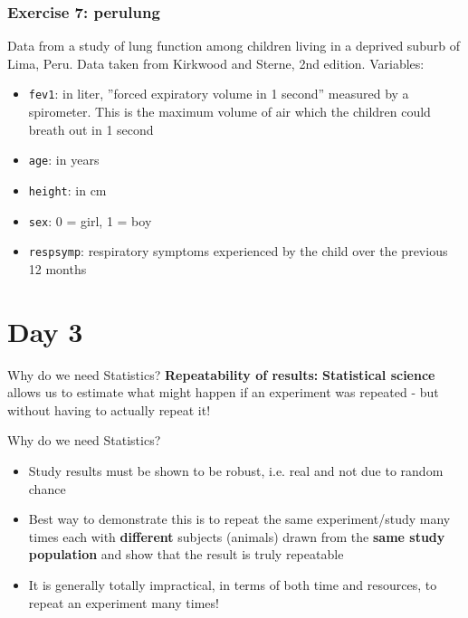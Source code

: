 \documentclass{beamer}\usepackage[]{graphicx}\usepackage[]{color}
\begin{document}
{{{\begin{frame}[fragile]
\end{frame}


\begin{frame}[fragile]
\frametitle{Exercise 7: perulung}
Data from a study of lung function among children living in a deprived suburb of
Lima, Peru. Data taken from Kirkwood and Sterne, 2nd edition. \newline
Variables:
\begin{itemize}
\item \texttt{fev1}:  in liter, ''forced expiratory volume in 1 second'' measured
by a spirometer. This is the maximum volume of air which the children could breath
out in 1 second
\item \texttt{age}: in years
\item \texttt{height}: in cm
\item \texttt{sex}: 0 = girl, 1 = boy
\item \texttt{respsymp}: respiratory symptoms experienced by the child over the
previous 12 months
\end{itemize}
\end{frame}

\section{Day 3}
\usebackgroundtemplate{}
\begin{frame}{Why do we need Statistics?}
\Large{\textbf{Repeatability of results:}} \newline
\textbf{Statistical science} allows us to
estimate what might happen if an experiment was repeated - but without having to
actually repeat it!
\end{frame}


\begin{frame}{Why do we need Statistics?}
\vspace{0.5cm}
\begin{itemize}
\setlength\itemsep{1.5em}
\item Study results must be shown to be robust, i.e. real and not due to random
chance
\item Best way to demonstrate this is to repeat the same experiment/study many
times each with {\bfseries different} subjects (animals) drawn from the {\bfseries
same study population} and show that the result is truly repeatable
\item It is generally totally impractical, in terms of both time and resources,
to repeat an experiment many times!
\end{itemize}
\vspace{0.5cm}
\end{frame}

}}}
\end{document}
